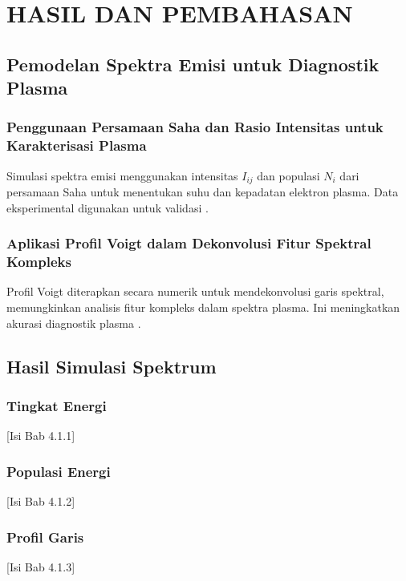 \chapter{HASIL DAN PEMBAHASAN}

\section{Pemodelan Spektra Emisi untuk Diagnostik Plasma}
\subsection{Penggunaan Persamaan Saha dan Rasio Intensitas untuk Karakterisasi Plasma}
Simulasi spektra emisi menggunakan intensitas $I_{ij}$ dan populasi $N_i$ dari persamaan Saha untuk menentukan suhu dan kepadatan elektron plasma. Data eksperimental digunakan untuk validasi \citep{Mason2015}.

\subsection{Aplikasi Profil Voigt dalam Dekonvolusi Fitur Spektral Kompleks}
\par Profil Voigt diterapkan secara numerik untuk mendekonvolusi garis spektral, memungkinkan analisis fitur kompleks dalam spektra plasma. Ini meningkatkan akurasi diagnostik plasma \citep{Demtroder2010}.
\section{Hasil Simulasi Spektrum}
\subsection{Tingkat Energi}
[Isi Bab 4.1.1]

\subsection{Populasi Energi}
[Isi Bab 4.1.2]

\subsection{Profil Garis}
[Isi Bab 4.1.3]


